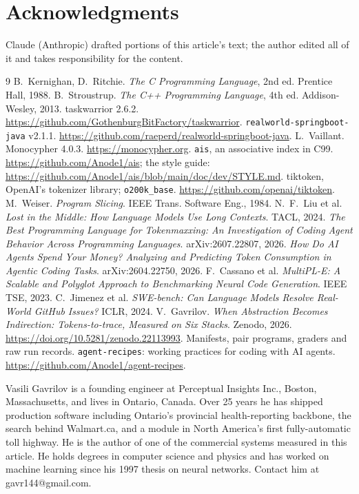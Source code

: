 \documentclass[journal]{IEEEtran}
\begin{document}
\section*{Acknowledgments}
Claude (Anthropic) drafted portions of this article's text; the author
edited all of it and takes responsibility for the content.

\begin{thebibliography}{9}
 B.~Kernighan, D.~Ritchie. \emph{The C Programming
Language}, 2nd ed. Prentice Hall, 1988.
 B.~Stroustrup. \emph{The C++ Programming
Language}, 4th ed. Addison-Wesley, 2013.
 taskwarrior 2.6.2.
\url{https://github.com/GothenburgBitFactory/taskwarrior}.
 \texttt{realworld-springboot-java} v2.1.1.
\url{https://github.com/raeperd/realworld-springboot-java}.
 L.~Vaillant. Monocypher 4.0.3.
\url{https://monocypher.org}.
 \texttt{ais}, an associative index in C99.
\url{https://github.com/Anode1/ais}; the style guide:
\url{https://github.com/Anode1/ais/blob/main/doc/dev/STYLE.md}.
 tiktoken, OpenAI's tokenizer library;
\texttt{o200k\_base}. \url{https://github.com/openai/tiktoken}.
 M.~Weiser. \emph{Program Slicing}. IEEE Trans.
Software Eng., 1984.
 N.~F.~Liu et al. \emph{Lost in the Middle: How
Language Models Use Long Contexts}. TACL, 2024.
 \emph{The Best Programming Language for
Tokenmaxxing: An Investigation of Coding Agent Behavior Across
Programming Languages}. arXiv:2607.22807, 2026.
 \emph{How Do AI Agents Spend Your Money? Analyzing and
Predicting Token Consumption in Agentic Coding Tasks}.
arXiv:2604.22750, 2026.
 F.~Cassano et al. \emph{MultiPL-E: A Scalable and
Polyglot Approach to Benchmarking Neural Code Generation}. IEEE TSE,
2023.
 C.~Jimenez et al. \emph{SWE-bench: Can Language
Models Resolve Real-World GitHub Issues?} ICLR, 2024.
 V.~Gavrilov. \emph{When Abstraction Becomes Indirection:
Tokens-to-trace, Measured on Six Stacks}. Zenodo, 2026.
\url{https://doi.org/10.5281/zenodo.22113993}. Manifests, pair
programs, graders and raw run records.
 \texttt{agent-recipes}: working practices for coding
with AI agents. \url{https://github.com/Anode1/agent-recipes}.
\end{thebibliography}

\begin{IEEEbiographynophoto}{Vasili Gavrilov}
is a founding engineer at Perceptual Insights Inc., Boston,
Massachusetts, and lives in Ontario, Canada. Over 25 years he has
shipped production software including Ontario's provincial
health-reporting backbone, the search behind Walmart.ca, and a module
in North America's first fully-automatic toll highway. He is the
author of one of the commercial systems measured in this article. He
holds degrees in computer science and physics and has worked on
machine learning since his 1997 thesis on neural networks. Contact him
at gavr144@gmail.com.
\end{IEEEbiographynophoto}
\end{document}
